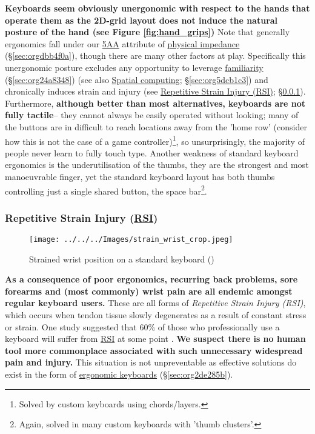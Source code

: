 \documentclass[logo,bsc,singlespacing,parskip]{infthesis}
\begin{document}
\textbf{Keyboards seem obviously unergonomic with respect to the hands that operate them as the 2D-grid layout does not induce the natural posture of the hand (see Figure \ref{fig:hand_grips})}
Note that generally ergonomics fall under our \hyperref[orgafbfd0c]{5AA} attribute of \hyperref[sec:orgdbb4f0a]{physical impedance} (\S \ref{sec:orgdbb4f0a}), though there are many other factors at play.
Specifically this unergonomic posture excludes any opportunity to leverage \hyperref[sec:org24a8348]{familiarity} (\S \ref{sec:org24a8348})
(see also \hyperref[sec:org5dcb1c3]{Spatial computing}; \S \ref{sec:org5dcb1c3}) and chronically induces strain and injury (see \hyperref[sec:org4a0ff07]{Repetitive Strain Injury (RSI)}; \S \ref{sec:org4a0ff07}).
Furthermore, \textbf{although better than most alternatives, keyboards are not fully tactile}-- they cannot always be easily operated without looking; many of the buttons are in difficult to reach locations away from the 'home row' (consider how this is not the case of a game controller)\footnote{Solved by custom keyboards using chords/layers.}, so unsurprisingly, the majority of people never learn to fully touch type.
Another weakness of standard keyboard ergonomics is the underutilisation of the thumbs,  they are the strongest and most manoeuvrable finger, yet the standard keyboard layout has both thumbs controlling just a single shared button, the space bar\footnote{Again, solved in many custom keyboards with 'thumb clusters'.}.

\subsubsection{Repetitive Strain Injury (\hyperref[orgc186d45]{RSI})}
\label{sec:org4a0ff07}
\begin{figure}[h]
\centering
\texttt{[image: ../../../Images/strain\_wrist\_crop.jpeg]}
\caption{Strained wrist position on a standard keyboard (\autocite{ZergoFreedomErgonomics})}
\end{figure}

\textbf{As a consequence of  poor ergonomics, recurring back problems, sore forearms and (most commonly) wrist pain are all endemic amongst regular keyboard users.}
These are all forms of \emph{Repetitive Strain Injury (\label{orgc186d45}RSI)}, which   occurs when tendon tissue slowly degenerates as a result of constant stress or strain.
One study suggested that 60\% of those who professionally use a keyboard will suffer from \hyperref[orgc186d45]{RSI} at some point \autocite{namayandegiEVALUATIONMETHODWHICH2015}.
\textbf{We suspect there is no human tool more commonplace associated with such unnecessary widespread pain and injury.}
This situation is not unpreventable as effective solutions do exist in the form of \hyperref[sec:org2de285b]{ergonomic keyboards} (\S \ref{sec:org2de285b}).
\end{document}

